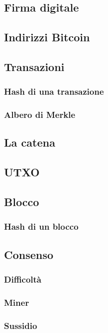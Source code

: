 \documentclass{article}
\begin{document}
\subsection{Firma digitale}

\subsection{Indirizzi Bitcoin}

\subsection{Transazioni}
\subsubsection{Hash di una transazione}
\subsubsection{Albero di Merkle}

\subsection{La catena}

\subsection{UTXO}

\subsection{Blocco}
\subsubsection{Hash di un blocco}

\subsection{Consenso}
\subsubsection{Difficoltà}
\subsubsection{Miner}
\subsubsection{Sussidio}
\end{document}
